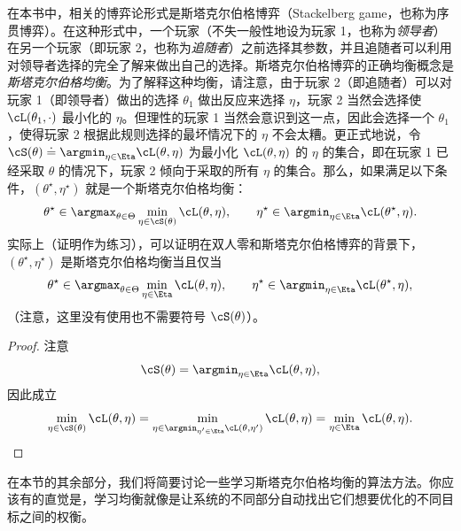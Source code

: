 \documentclass[../../book-main_zh.tex]{subfiles}
\begin{document}
在本书中，相关的博弈论形式是斯塔克尔伯格博弈（Stackelberg game，也称为序贯博弈）。在这种形式中，一个玩家（不失一般性地设为玩家 1，也称为\textit{领导者}）在另一个玩家（即玩家 2，也称为\textit{追随者}）之前选择其参数，并且追随者可以利用对领导者选择的完全了解来做出自己的选择。斯塔克尔伯格博弈的正确均衡概念是\textit{斯塔克尔伯格均衡}。为了解释这种均衡，请注意，由于玩家 2（即追随者）可以对玩家 1（即领导者）做出的选择 \(\theta_{1}\) 做出反应来选择 \(\eta\)，玩家 2 当然会选择使 \(\cL(\theta_{1}, \cdot)\) 最小化的 \(\eta\)。但理性的玩家 1 当然会意识到这一点，因此会选择一个 \(\theta_{1}\)，使得玩家 2 根据此规则选择的最坏情况下的 \(\eta\) 不会太糟。更正式地说，令 \(\cS(\theta) \doteq \argmin_{\eta \in
\Eta}\cL(\theta, \eta)\) 为最小化 \(\cL(\theta, \eta)\) 的 \(\eta\) 的集合，即在玩家 1 已经采取 \(\theta\) 的情况下，玩家 2 倾向于采取的所有 \(\eta\) 的集合。那么，如果满足以下条件，\((\theta^{\star}, \eta^{\star})\) 就是一个斯塔克尔伯格均衡：
\begin{equation}
    \theta^{\star} \in \argmax_{\theta \in \Theta}\min_{\eta \in
    \cS(\theta)}\cL(\theta, \eta), \qquad \eta^{\star} \in
    \argmin_{\eta  \in \Eta}\cL(\theta^{\star}, \eta).
\end{equation}
实际上（证明作为练习），可以证明在双人零和斯塔克尔伯格博弈的背景下，\((\theta^{\star},
\eta^{\star})\) 是斯塔克尔伯格均衡当且仅当
\begin{equation}
    \theta^{\star} \in \argmax_{\theta \in \Theta}\min_{\eta \in
    \Eta}\cL(\theta, \eta), \qquad \eta^{\star} \in \argmin_{\eta
    \in \Eta}\cL(\theta^{\star}, \eta),
\end{equation}
（注意，这里没有使用也不需要符号 \(\cS(\theta)\)）。
\begin{proof} %
    注意
    \begin{equation}
        \cS(\theta) = \argmin_{\eta \in \Eta}\cL(\theta, \eta),
    \end{equation}
    因此成立
    \begin{equation}
        \min_{\eta \in \cS(\theta)}\cL(\theta, \eta) = \min_{\eta \in
            \argmin_{\eta^{\prime} \in \Eta}\cL(\theta,
        \eta^{\prime})}\cL(\theta, \eta) = \min_{\eta \in
        \Eta}\cL(\theta, \eta).
    \end{equation}
\end{proof}

在本节的其余部分，我们将简要讨论一些学习斯塔克尔伯格均衡的算法方法。你应该有的直觉是，学习均衡就像是让系统的不同部分自动找出它们想要优化的不同目标之间的权衡。
\end{document}
